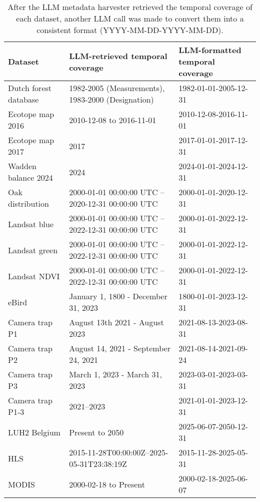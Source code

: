 \begin{table}
\caption{After the LLM metadata harvester retrieved the temporal coverage of each dataset, another LLM call was made to convert them into a consistent format (YYYY-MM-DD-YYYY-MM-DD).}
\label{tab:temporal_coverage_conversion}
\begin{tabular}{lll}
\toprule
Dataset & LLM-retrieved temporal coverage & LLM-formatted temporal coverage \\
\midrule
Dutch forest database & 1982-2005 (Measurements), 1983-2000 (Designation) & 1982-01-01-2005-12-31 \\
Ecotope map 2016 & 2010-12-08 to 2016-11-01 & 2010-12-08-2016-11-01 \\
Ecotope map 2017 & 2017 & 2017-01-01-2017-12-31 \\
Wadden balance 2024 & 2024 & 2024-01-01-2024-12-31 \\
Oak distribution & 2000-01-01 00:00:00 UTC – 2020-12-31 00:00:00 UTC & 2000-01-01-2020-12-31 \\
Landsat blue & 2000-01-01 00:00:00 UTC – 2022-12-31 00:00:00 UTC & 2000-01-01-2022-12-31 \\
Landsat green & 2000-01-01 00:00:00 UTC – 2022-12-31 00:00:00 UTC & 2000-01-01-2022-12-31 \\
Landsat NDVI & 2000-01-01 00:00:00 UTC – 2022-12-31 00:00:00 UTC & 2000-01-01-2022-12-31 \\
eBird & January 1, 1800 - December 31, 2023 & 1800-01-01-2023-12-31 \\
Camera trap P1 & August 13th 2021 - August 2023 & 2021-08-13-2023-08-31 \\
Camera trap P2 & August 14, 2021 - September 24, 2021 & 2021-08-14-2021-09-24 \\
Camera trap P3 & March 1, 2023 - March 31, 2023 & 2023-03-01-2023-03-31 \\
Camera trap P1-3 & 2021–2023 & 2021-01-01-2023-12-31 \\
LUH2 Belgium & Present to 2050 & 2025-06-07-2050-12-31 \\
HLS & 2015-11-28T00:00:00Z–2025-05-31T23:38:19Z & 2015-11-28-2025-05-31 \\
MODIS & 2000-02-18 to Present & 2000-02-18-2025-06-07 \\
\bottomrule
\end{tabular}
\end{table}
